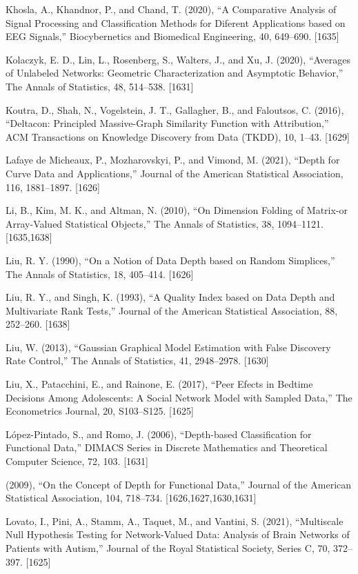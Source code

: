 \documentclass[
  10
]{article}
\newcounter{none} %
\begin{document}
Khosla, A., Khandnor, P., and Chand, T. (2020), ``A Comparative Analysis
of Signal Processing and Classification Methods for Diferent
Applications based on EEG Signals,'' Biocybernetics and Biomedical
Engineering, 40, 649--690. {[}1635{]}

Kolaczyk, E. D., Lin, L., Rosenberg, S., Walters, J., and Xu, J. (2020),
``Averages of Unlabeled Networks: Geometric Characterization and
Asymptotic Behavior,'' The Annals of Statistics, 48, 514--538.
{[}1631{]}

Koutra, D., Shah, N., Vogelstein, J. T., Gallagher, B., and Faloutsos,
C. (2016), ``Deltacon: Principled Massive-Graph Similarity Function with
Attribution,'' ACM Transactions on Knowledge Discovery from Data (TKDD),
10, 1--43. {[}1629{]}

Lafaye de Micheaux, P., Mozharovskyi, P., and Vimond, M. (2021), ``Depth
for Curve Data and Applications,'' Journal of the American Statistical
Association, 116, 1881--1897. {[}1626{]}

Li, B., Kim, M. K., and Altman, N. (2010), ``On Dimension Folding of
Matrix-or Array-Valued Statistical Objects,'' The Annals of Statistics,
38, 1094--1121. {[}1635,1638{]}

Liu, R. Y. (1990), ``On a Notion of Data Depth based on Random
Simplices,'' The Annals of Statistics, 18, 405--414. {[}1626{]}

Liu, R. Y., and Singh, K. (1993), ``A Quality Index based on Data Depth
and Multivariate Rank Tests,'' Journal of the American Statistical
Association, 88, 252--260. {[}1638{]}

Liu, W. (2013), ``Gaussian Graphical Model Estimation with False
Discovery Rate Control,'' The Annals of Statistics, 41, 2948--2978.
{[}1630{]}

Liu, X., Patacchini, E., and Rainone, E. (2017), ``Peer Efects in
Bedtime Decisions Among Adolescents: A Social Network Model with Sampled
Data,'' The Econometrics Journal, 20, S103--S125. {[}1625{]}

López-Pintado, S., and Romo, J. (2006), ``Depth-based Classification for
Functional Data,'' DIMACS Series in Discrete Mathematics and Theoretical
Computer Science, 72, 103. {[}1631{]}

(2009), ``On the Concept of Depth for Functional Data,'' Journal of the
American Statistical Association, 104, 718--734.
{[}1626,1627,1630,1631{]}

Lovato, I., Pini, A., Stamm, A., Taquet, M., and Vantini, S. (2021),
``Multiscale Null Hypothesis Testing for Network-Valued Data: Analysis
of Brain Networks of Patients with Autism,'' Journal of the Royal
Statistical Society, Series C, 70, 372--397. {[}1625{]}
\end{document}
